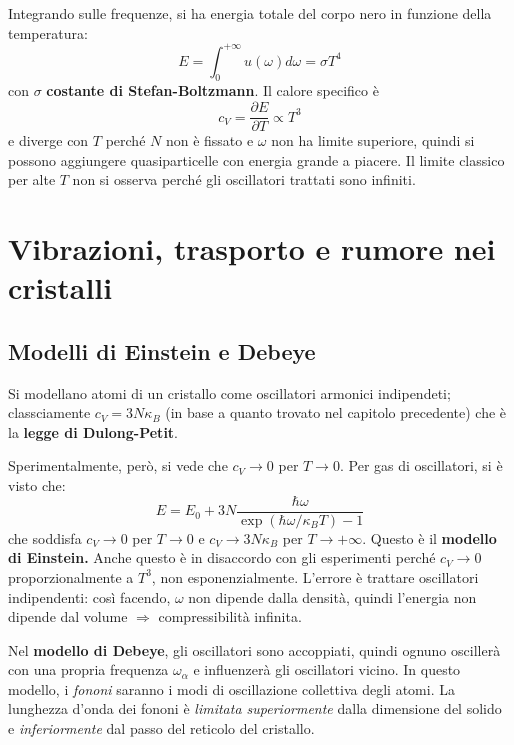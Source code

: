 \documentclass[10pt, a4paper]{scrartcl}
\numberwithin{equation}{subsection}
\theoremstyle{style1}
\begin{document}
Integrando sulle frequenze, si ha energia totale del corpo nero in funzione della temperatura:
\begin{equation}
	E = \int_{0} ^{+\infty} u(\omega) d\omega = \sigma T^4
\end{equation}
con $\sigma $ \textbf{costante di Stefan-Boltzmann}. Il calore specifico \`e 
\begin{equation}
	c_ V = \frac{\partial E}{\partial T} \propto T^3		
\end{equation}
e diverge con $T$  perch\'e $N$ non \`e fissato e $\omega$ non ha limite superiore, quindi si possono aggiungere quasiparticelle con energia grande a piacere. 
Il limite classico per alte $T$ non si osserva perch\'e gli oscillatori trattati sono infiniti.

\newpage

\section{Vibrazioni, trasporto e rumore nei cristalli}
\subsection{Modelli di Einstein e Debeye}
Si modellano atomi di un cristallo come oscillatori armonici indipendeti; classciamente $c_V = 3 N \kappa _B$ (in base a quanto trovato nel capitolo precedente)
che \`e la \textbf{legge di Dulong-Petit}.

Sperimentalmente, però, si vede che $c_V \to 0 $ per $T \to 0$.
Per gas di oscillatori, si \`e visto che:
\[
E = E_0 + 3N \frac{\hbar \omega}{\exp(\hbar \omega / \kappa _B T) -1 }
\] 
che soddisfa $c_V \to 0$ per $T \to 0$ e $c_V \to 3N \kappa _B $ per $T \to + \infty$. 
Questo \`e il \textbf{modello di Einstein.} 
Anche questo \`e in disaccordo con gli esperimenti perch\'e $c_V \to 0$ proporzionalmente a $T^3$, non esponenzialmente.
L'errore \`e trattare oscillatori indipendenti: cos\`i facendo, $\omega$ non dipende dalla densit\`a, quindi l'energia non dipende dal volume $\Rightarrow $ compressibilit\`a infinita.

Nel \textbf{modello di Debeye}, gli oscillatori sono accoppiati, quindi ognuno osciller\`a con una propria frequenza $\omega_\alpha $ e influenzer\`a gli oscillatori vicino. In questo modello, i \textit{fononi} saranno i modi di oscillazione collettiva degli atomi.
La lunghezza d'onda dei fononi \`e \textit{limitata superiormente} dalla dimensione del solido e \textit{inferiormente} dal passo del reticolo del cristallo.
\end{document}
